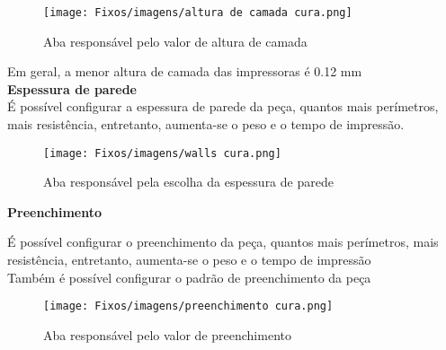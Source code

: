 \begin{figure}[h!]

    \centering

    \texttt{[image: Fixos/imagens/altura de camada cura.png]}

    \caption{Aba responsável pelo valor de altura de camada}

    \label{fig:my_label}

\end{figure}



\small Em geral, a menor altura de camada das impressoras é 0.12 mm\\[0.2cm]



\textbf{Espessura de parede} \\[0.2cm]

É possível configurar a espessura de parede da peça, quantos mais perímetros, mais resistência, entretanto, aumenta-se o peso e o tempo de impressão.\\[0.2cm]



\begin{figure}[h!]

    \centering

    \texttt{[image: Fixos/imagens/walls cura.png]}

    \caption{Aba responsável pela escolha da espessura de parede}

    \label{fig:my_label}

\end{figure}



\textbf{Preenchimento}

É possível configurar o preenchimento da peça, quantos mais perímetros, mais resistência, entretanto, aumenta-se o peso e o tempo de impressão \\[0.2cm]

Também é possível configurar o padrão de preenchimento da peça \\[0.2cm]



\begin{figure}[h!]

    \centering

    \texttt{[image: Fixos/imagens/preenchimento cura.png]}

    \caption{Aba responsável pelo valor de preenchimento}

    \label{fig:my_label}

\end{figure}



